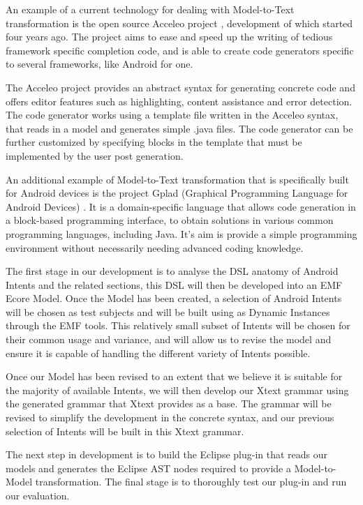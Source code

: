 An example of a current technology for dealing with Model-to-Text transformation is the open source Acceleo project \cite{acceleo}, development of which started four years ago. The project aims to ease and speed up the writing of tedious framework specific completion code, and is able to create code generators specific to several frameworks, like Android for one.

The Acceleo project provides an abstract syntax for generating concrete code and offers editor features such as highlighting, content assistance and error detection. The code generator works using a template file written in the Acceleo syntax, that reads in a model and generates simple .java files. The code generator can be further customized by specifying blocks in the template that must be implemented by the user post generation.

An additional example of Model-to-Text transformation that is specifically built for Android devices is the project Gplad (Graphical Programming Language for Android Devices) \cite{gplad}. It is a domain-specific language that allows code generation in a block-based programming interface, to obtain solutions in various common programming languages, including Java. It's aim is provide a simple programming environment without necessarily needing advanced coding knowledge.

The first stage in our development is to analyse the DSL anatomy of Android Intents and the related sections, this DSL will then be developed into an EMF Ecore Model. Once the Model has been created, a selection of Android Intents will be chosen as test subjects and will be built using as Dynamic Instances through the EMF tools. This relatively small subset of Intents will be chosen for their common usage and variance, and will allow us to revise the model and ensure it is capable of handling the different variety of Intents possible.

Once our Model has been revised to an extent that we believe it is suitable for the majority of available Intents, we will then develop our Xtext grammar using the generated grammar that Xtext provides as a base. The grammar will be revised to simplify the development in the concrete syntax, and our previous selection of Intents will be built in this Xtext grammar.

The next step in development is to build the Eclipse plug-in that reads our models and generates the Eclipse AST nodes required to provide a Model-to-Model transformation. The final stage is to thoroughly test our plug-in and run our evaluation.

